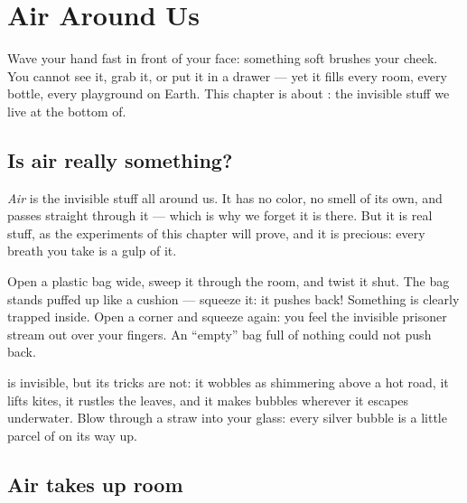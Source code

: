 \chapter{Air Around Us}\label{ch:g2:air-around-us}

Wave your hand fast in front of your face: something soft brushes
your cheek. You cannot see it, grab it, or put it in a drawer --- yet
it fills every room, every bottle, every playground on Earth. This
chapter is about : the invisible stuff we live at the bottom of.

\section{Is air really something?}

\begin{definition}[Air]\label{def:g2:air-around-us:air}
\emph{Air} is the invisible stuff all around us. It has
no color, no smell of its own, and  passes straight through it
--- which is why we forget it is there. But it is real stuff, as the
experiments of this chapter will prove, and it is precious: every
breath you take is a gulp of it.
\end{definition}

\begin{example}\label{ex:g2:air-around-us:catch}
Open a plastic bag wide, sweep it through the room, and twist it
shut. The bag stands puffed up like a cushion --- squeeze it: it
pushes back! Something is clearly trapped inside. Open a corner and
squeeze again: you feel the invisible prisoner stream out over your
fingers. An ``empty'' bag full of nothing could not push back.
\end{example}

\begin{example}\label{ex:g2:air-around-us:shows}
 is invisible, but its tricks are not: it wobbles as shimmering
above a hot road, it lifts kites, it rustles the leaves, and it makes
bubbles wherever it escapes underwater. Blow through a straw into
your glass: every silver bubble is a little parcel of  on its way
up.
\end{example}

\section{Air takes up room}

